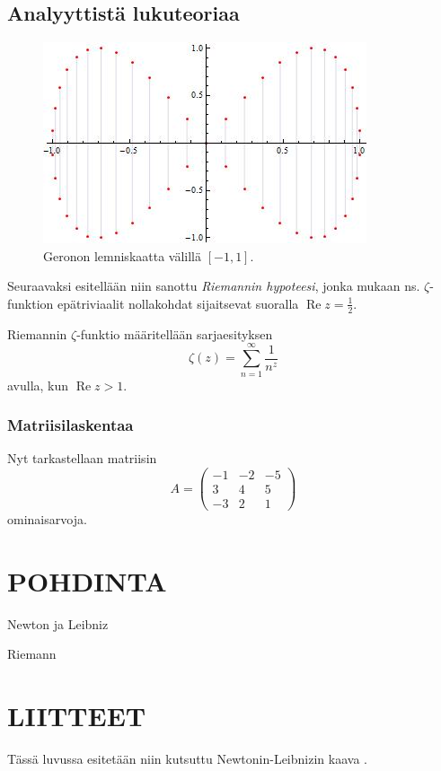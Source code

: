 \subsection{Analyyttistä lukuteoriaa}

\begin{figure}[ht]
\begin{center}
\includegraphics[width=.45\textwidth]{siivet.jpg}
\end{center}
\label{kuvatus1}
\caption{Geronon lemniskaatta välillä $[-1,1]$.}
\end{figure}

Seuraavaksi esitellään niin sanottu {\em Riemannin hypoteesi}, jonka mukaan ns. $\zeta$-funktion epätriviaalit nollakohdat sijaitsevat suoralla $\operatorname{Re}z=\frac12$.
\begin{definition} Riemannin $\zeta$-funktio määritellään sarjaesityksen \cite{Riemann}
\[
\zeta(z)=\sum_{n=1}^{\infty}\frac{1}{n^z}
\]
avulla, kun $\operatorname{Re}z>1$.
\end{definition}

\subsubsection{Matriisilaskentaa}

Nyt tarkastellaan matriisin
\[
A=\left(\begin{array}{rrr} -1 & -2 & -5\\ 3& 4& 5\\ -3 & 2 & 1 \end{array}\right)
\]
ominaisarvoja.



\section{POHDINTA}
\lipsum[1-3]


 
\begin{thebibliography}{99}

 Newton ja Leibniz

 Riemann

\end{thebibliography}

\section{LIITTEET}

Tässä luvussa esitetään niin kutsuttu Newtonin-Leibnizin kaava \cite{NewtLeib}.


